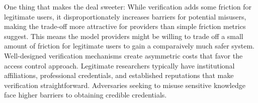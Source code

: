 \documentclass{article}
\theoremstyle{plain}
\theoremstyle{definition}
\theoremstyle{remark}
\begin{document}
One thing that makes the deal sweeter: While verification adds some friction for legitimate users, it disproportionately increases barriers for potential misusers, making the trade-off more attractive for providers than simple friction metrics suggest.
This means the model providers might be willing to trade off a small amount of friction for legitimate users to gain a comparaively much safer system.
Well-designed verification mechanisms create asymmetric costs that favor the access control approach.
Legitimate researchers typically have institutional affiliations, professional credentials, and established reputations that make verification straightforward.
Adversaries seeking to misuse sensitive knowledge face higher barriers to obtaining credible credentials.

\end{document}

